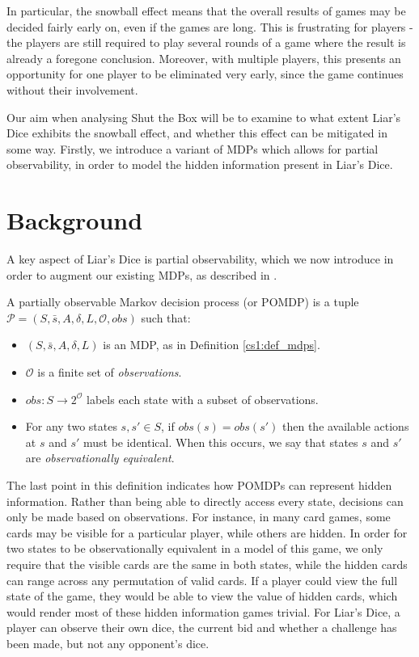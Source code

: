 In particular, the snowball effect means that the overall results of games may be decided fairly early on, even if the games are long. This is frustrating for players - the players are still required to play several rounds of a game where the result is already a foregone conclusion. Moreover, with multiple players, this presents an opportunity for one player to be eliminated very early, since the game continues without their involvement.

Our aim when analysing Shut the Box will be to examine to what extent Liar's Dice exhibits the snowball effect, and whether this effect can be mitigated in some way. Firstly, we introduce a variant of MDPs which allows for partial observability, in order to model the hidden information present in Liar's Dice.

\section{Background}

A key aspect of Liar's Dice is partial observability, which we now introduce in order to augment our existing MDPs, as described in \cite{norman_verification_2017}.

\begin{definition}
    \label{cs2:def-pomdps}

    A partially observable Markov decision process (or POMDP) is a tuple $\mathcal{P} = (S, \bar{s}, A, \delta, L, \mathcal{O}, obs)$ such that:

    \begin{itemize}
        \item $(S, \bar{s}, A, \delta, L)$ is an MDP, as in Definition \ref{cs1:def_mdps}.
        \item $\mathcal{O}$ is a finite set of \emph{observations}.
        \item $obs : S \rightarrow 2^{\mathcal{O}}$ labels each state with a subset of observations.
        \item For any two states $s, s' \in S$, if $obs(s) = obs(s')$ then the available actions at $s$ and $s'$ must be identical. When this occurs, we say that states $s$ and $s'$ are \emph{observationally equivalent}.
    \end{itemize}
\end{definition}

The last point in this definition indicates how POMDPs can represent hidden information. Rather than being able to directly access every state, decisions can only be made based on observations. For instance, in many card games, some cards may be visible for a particular player, while others are hidden. In order for two states to be observationally equivalent in a model of this game, we only require that the visible cards are the same in both states, while the hidden cards can range across any permutation of valid cards. If a player could view the full state of the game, they would be able to view the value of hidden cards, which would render most of these hidden information games trivial. For Liar's Dice, a player can observe their own dice, the current bid and whether a challenge has been made, but not any opponent's dice.

